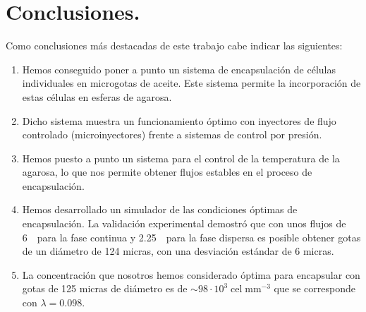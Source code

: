 \section{Conclusiones.}\label{sec:6_conclusiones}

Como conclusiones más destacadas de este trabajo cabe indicar las siguientes:

\begin{enumerate}
    \item Hemos conseguido poner a punto un sistema de encapsulación de células individuales en microgotas de aceite. Este sistema permite la incorporación de estas células en esferas de agarosa.
    
    \item Dicho sistema muestra un funcionamiento óptimo con inyectores de flujo controlado (microinyectores) frente a sistemas de control por presión.
    
    \item Hemos puesto a punto un sistema para el control de la temperatura de la agarosa, lo que nos permite obtener flujos estables en el proceso de encapsulación.
    
    \item Hemos desarrollado un simulador de las condiciones óptimas de encapsulación. La validación experimental demostró que con unos flujos de 6~\microlitrosporminuto\ para la fase continua y 2.25~\microlitrosporminuto\ para la fase dispersa es posible obtener gotas de un diámetro de 124 micras, con una desviación estándar de 6 micras.
    
    \item La concentración que nosotros hemos considerado óptima para encapsular con gotas de 125 micras de diámetro es de $\sim98\cdot{10}^{3}\;\mathrm{cel\;mm^{-3}}$ que se corresponde con $\lambda=0.098$. 
    
\end{enumerate}

\nocite{article:freeman}
\nocite{article:ralf}
\nocite{article:pingan}
\nocite{article:huifa}
\nocite{article:ye-jin}
\nocite{article:sarah}
\nocite{article:haihu}
\nocite{book:andreas}
\nocite{article:piotr}
\nocite{article:andrew_s}
\nocite{article:richard}
\nocite{article:hirose}
\nocite{article:haakan}